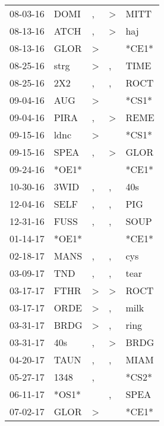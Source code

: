 \begin{supertabular}{lllll}
 08-03-16 &   DOMI &                , &     \textgreater &   MITT \\
 08-13-16 &   ATCH &                , &     \textgreater &    haj \\
 08-13-16 &   GLOR &     \textgreater &                  &  *CE1* \\
 08-25-16 &   strg &     \textgreater &                , &   TIME \\
 08-25-16 &    2X2 &                , &                , &   ROCT \\
 09-04-16 &    AUG &     \textgreater &                  &  *CS1* \\
 09-04-16 &   PIRA &                , &     \textgreater &   REME \\
 09-15-16 &   ldnc &     \textgreater &                  &  *CS1* \\
 09-15-16 &   SPEA &                , &     \textgreater &   GLOR \\
 09-24-16 &  *OE1* &                  &                  &  *CE1* \\
 10-30-16 &   3WID &                , &                , &    40s \\
 12-04-16 &   SELF &                , &                , &    PIG \\
 12-31-16 &   FUSS &                , &                , &   SOUP \\
 01-14-17 &  *OE1* &                  &                  &  *CE1* \\
 02-18-17 &   MANS &                , &                , &    cys \\
 03-09-17 &    TND &                , &                , &   tear \\
 03-17-17 &   FTHR &     \textgreater &     \textgreater &   ROCT \\
 03-17-17 &   ORDE &     \textgreater &                , &   milk \\
 03-31-17 &   BRDG &     \textgreater &                , &   ring \\
 03-31-17 &    40s &                , &     \textgreater &   BRDG \\
 04-20-17 &   TAUN &                , &                , &   MIAM \\
 05-27-17 &   1348 &                , &                  &  *CS2* \\
 06-11-17 &  *OS1* &                  &                , &   SPEA \\
 07-02-17 &   GLOR &     \textgreater &                  &  *CE1* \\

\end{supertabular}
